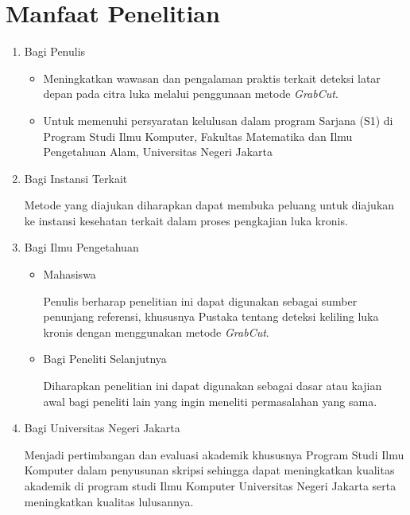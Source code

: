 \section{Manfaat Penelitian}
\begin{enumerate}
	\item Bagi Penulis
	\begin{itemize}
		\item Meningkatkan wawasan dan pengalaman praktis terkait deteksi latar 
		depan pada citra luka melalui penggunaan metode \emph{GrabCut}.

		\item Untuk memenuhi persyaratan kelulusan dalam program Sarjana (S1) di 
		Program Studi Ilmu Komputer, Fakultas Matematika dan Ilmu Pengetahuan Alam, 
		Universitas Negeri Jakarta
	\end{itemize}
		
	\item Bagi Instansi Terkait
	
	Metode yang diajukan diharapkan dapat membuka peluang untuk diajukan ke instansi 
	kesehatan terkait dalam proses pengkajian luka kronis.

	\item Bagi Ilmu Pengetahuan

	\begin{itemize}
		\item Mahasiswa
		
		Penulis berharap penelitian ini dapat digunakan sebagai sumber penunjang 
		referensi, khususnya Pustaka tentang deteksi keliling luka kronis dengan 
		menggunakan metode \emph{GrabCut}.

		\item Bagi Peneliti Selanjutnya
	
		Diharapkan penelitian ini dapat digunakan sebagai dasar atau kajian awal 
		bagi peneliti lain yang ingin meneliti permasalahan yang sama.
	\end{itemize}

	\item Bagi Universitas Negeri Jakarta
	
	Menjadi pertimbangan dan evaluasi akademik khususnya Program Studi Ilmu Komputer 
	dalam penyusunan skripsi sehingga dapat meningkatkan kualitas akademik di program 
	studi Ilmu Komputer Universitas Negeri Jakarta serta meningkatkan kualitas lulusannya.
			
\end{enumerate}

\begin{comment}

\end{comment}